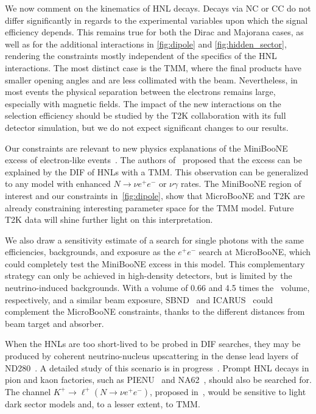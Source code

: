 \documentclass[
reprint,
superscriptaddress,
showpacs,
preprintnumbers,
bibnotes,
amsmath,
amssymb,
aps,
prd,
floatfix
]{revtex4-2}
\begin{document}
We now comment on the kinematics of HNL decays. 
Decays via NC or CC do not differ significantly in regards to the experimental variables upon which the signal efficiency depends.
This remains true for both the Dirac and Majorana cases, as well as for the additional interactions in \cref{fig:dipole} and \cref{fig:hidden_sector}, rendering the constraints mostly independent of the specifics of the HNL interactions. 
The most distinct case is the TMM, where the final products have smaller opening angles and are less collimated with the beam.
Nevertheless, in most events the physical separation between the electrons remains large, especially with magnetic fields. 
The impact of the new interactions on the selection efficiency should be studied by the T2K collaboration with its full detector simulation, but we do not expect significant changes to our results.

Our constraints are relevant to new physics explanations of the MiniBooNE excess of electron-like events~\cite{MiniBooNE:2018esg,MiniBooNE:2020pnu}. 
The authors of~\cite{Fischer:2019fbw} proposed that the excess can be explained by the DIF of HNLs with a TMM. 
This observation can be generalized to any model with enhanced $N\to \nu e^+e^-$ or $\nu \gamma$ rates. 
The MiniBooNE region of interest and our constraints in~\cref{fig:dipole}, show that MicroBooNE and T2K are already constraining interesting parameter space for the TMM model.
Future T2K data will shine further light on this interpretation.

We also draw a sensitivity estimate of a search for single photons with the same efficiencies, backgrounds, and exposure as the $e^+e^-$ search at MicroBooNE, which could completely test the MiniBooNE excess in this model. 
This complementary strategy can only be achieved in high-density detectors, but is limited by the neutrino-induced backgrounds.  
With a volume of 0.66 and 4.5 times the \muboone~volume, respectively, and a similar beam exposure, SBND~\cite{sbnd} and ICARUS~\cite{icarus} could complement the MicroBooNE constraints, thanks to the different distances from beam target and absorber.

When the HNLs are too short-lived to be probed in DIF searches, they may be produced by coherent neutrino-nucleus upscattering in the dense lead layers of ND280~\cite{Gninenko:2009ks,Gninenko:2010pr,Coloma:2017ppo,Vergani:2021tgc,Bertuzzo:2018itn,Ballett:2018ynz,Ballett:2019pyw}.
A detailed study of this scenario is in progress~\cite{upcoming}. 
Prompt HNL decays in pion and kaon factories, such as PIENU~\cite{PIENU:2017wbj,PIENU:2019usb} and NA62~\cite{NA62:2021bji,NA62:2020mcv}, should also be searched for. 
The channel $K^+\to\ell^+ (N \to \nu e^+e^-)$, proposed in~\cite{Ballett:2019pyw}, would be sensitive to light dark sector models and, to a lesser extent, to TMM.
\end{document}
